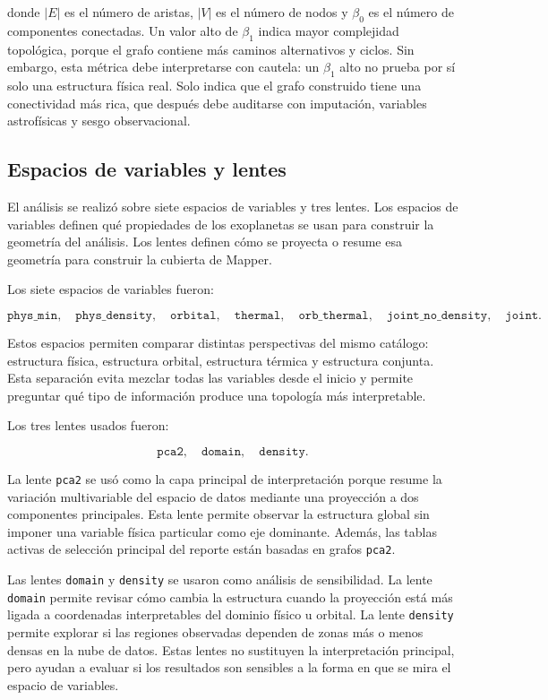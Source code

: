 donde \(|E|\) es el número de aristas, \(|V|\) es el número de nodos y \(\beta_0\) es el número de componentes conectadas. Un valor alto de \(\beta_1\) indica mayor complejidad topológica, porque el grafo contiene más caminos alternativos y ciclos. Sin embargo, esta métrica debe interpretarse con cautela: un \(\beta_1\) alto no prueba por sí solo una estructura física real. Solo indica que el grafo construido tiene una conectividad más rica, que después debe auditarse con imputación, variables astrofísicas y sesgo observacional.

\subsection*{Espacios de variables y lentes}

El análisis se realizó sobre siete espacios de variables y tres lentes. Los espacios de variables definen qué propiedades de los exoplanetas se usan para construir la geometría del análisis. Los lentes definen cómo se proyecta o resume esa geometría para construir la cubierta de Mapper.

Los siete espacios de variables fueron:

\[
\texttt{phys\_min},\quad
\texttt{phys\_density},\quad
\texttt{orbital},\quad
\texttt{thermal},\quad
\texttt{orb\_thermal},\quad
\texttt{joint\_no\_density},\quad
\texttt{joint}.
\]

Estos espacios permiten comparar distintas perspectivas del mismo catálogo: estructura física, estructura orbital, estructura térmica y estructura conjunta. Esta separación evita mezclar todas las variables desde el inicio y permite preguntar qué tipo de información produce una topología más interpretable.

Los tres lentes usados fueron:

\[
\texttt{pca2},\quad
\texttt{domain},\quad
\texttt{density}.
\]

La lente \texttt{pca2} se usó como la capa principal de interpretación porque resume la variación multivariable del espacio de datos mediante una proyección a dos componentes principales. Esta lente permite observar la estructura global sin imponer una variable física particular como eje dominante. Además, las tablas activas de selección principal del reporte están basadas en grafos \texttt{pca2}.

Las lentes \texttt{domain} y \texttt{density} se usaron como análisis de sensibilidad. La lente \texttt{domain} permite revisar cómo cambia la estructura cuando la proyección está más ligada a coordenadas interpretables del dominio físico u orbital. La lente \texttt{density} permite explorar si las regiones observadas dependen de zonas más o menos densas en la nube de datos. Estas lentes no sustituyen la interpretación principal, pero ayudan a evaluar si los resultados son sensibles a la forma en que se mira el espacio de variables.

